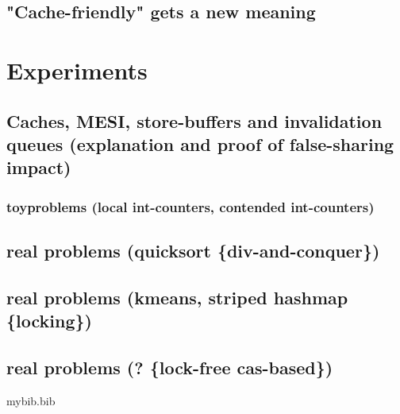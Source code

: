 \documentclass[a4paper, titlepage]{article}
\renewcommand{\%}{\scalebox{.9}{\oldpct}}
\begin{document}
\subsection{"Cache-friendly" gets a new meaning}

\section{Experiments}
\subsection{Caches, MESI, store-buffers and invalidation queues (explanation and proof of false-sharing impact)}
\subsubsection{toyproblems (local int-counters, contended int-counters)}
\subsection{real problems (quicksort \{div-and-conquer\})}
\subsection{real problems (kmeans, striped hashmap \{locking\})}
\subsection{real problems (? \{lock-free cas-based\})}

\begin{filecontents}{mybib.bib}
\end{filecontents}

\clearpage


\end{document}
